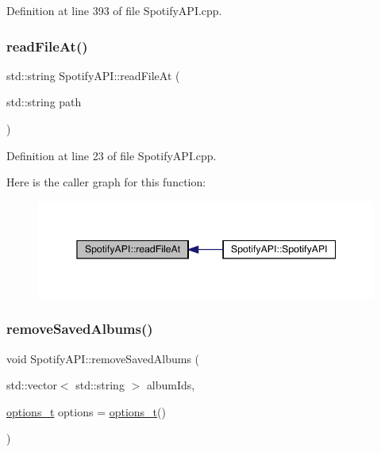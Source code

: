 Definition at line 393 of file Spotify\+A\+P\+I.\+cpp.

\mbox{\label{class_spotify_a_p_i_a0a20f7e551ea8c9bdd9046aecb56cf8f}} 
\subsubsection{\texorpdfstring{read\+File\+At()}{readFileAt()}}
{\footnotesize\ttfamily std\+::string Spotify\+A\+P\+I\+::read\+File\+At (\begin{DoxyParamCaption}\item[{std\+::string}]{path }\end{DoxyParamCaption})\hspace{0.3cm}{\ttfamily [private]}}



Definition at line 23 of file Spotify\+A\+P\+I.\+cpp.

Here is the caller graph for this function\+:
\nopagebreak
\begin{figure}[H]
\begin{center}
\leavevmode
\includegraphics[width=345pt]{class_spotify_a_p_i_a0a20f7e551ea8c9bdd9046aecb56cf8f_icgraph}
\end{center}
\end{figure}
\mbox{\label{class_spotify_a_p_i_ac17d1f6b822fcdf9c6ab6153ae8df6c3}} 
\subsubsection{\texorpdfstring{remove\+Saved\+Albums()}{removeSavedAlbums()}}
{\footnotesize\ttfamily void Spotify\+A\+P\+I\+::remove\+Saved\+Albums (\begin{DoxyParamCaption}\item[{std\+::vector$<$ std\+::string $>$}]{album\+Ids,  }\item[{\mbox{\hyperlink{_spotify_a_p_i_8h_a0ff5cac1a4007bb330b7d9939650c283}{options\+\_\+t}}}]{options = {\ttfamily \mbox{\hyperlink{_spotify_a_p_i_8h_a0ff5cac1a4007bb330b7d9939650c283}{options\+\_\+t}}()} }\end{DoxyParamCaption})}



